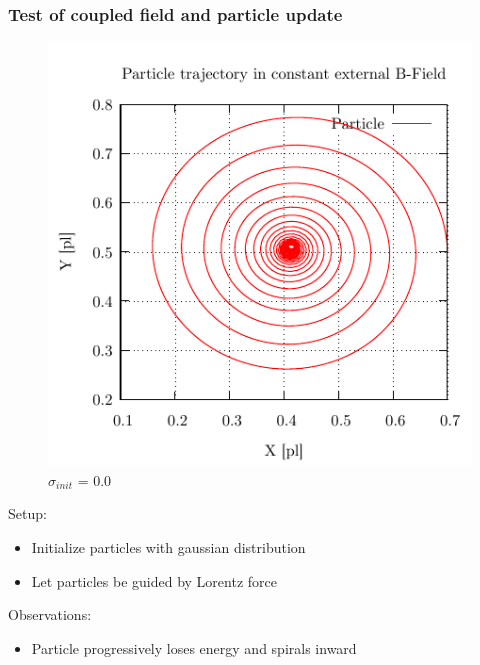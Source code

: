 \documentclass[5pt]{beamer}
\begin{document}
\begin{frame}
  \frametitle{Test of coupled field and particle update}
  \begin{minipage}{0.45\textwidth}
    \begin{figure}[h]
      \centering
      \includegraphics[width=\columnwidth]{trajectory_radiatinggood.pdf}
      \caption{$\sigma_{init}$ = 0.0}
      \label{fig:smallvar}
    \end{figure}
  \end{minipage}
  \hfill
  \begin{minipage}{0.5\textwidth}
  
  Setup:
  \begin{itemize}
    \item[\cdot] Initialize particles with gaussian distribution
    \item[\cdot] Let particles be guided by Lorentz force
  \end{itemize} 
  Observations:
  \begin{itemize}
    \item[\cdot] Particle progressively loses energy and spirals inward
  \end{itemize}
\end{minipage}


\end{frame}
\end{document}

